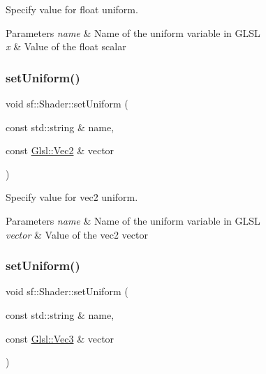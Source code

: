 Specify value for {\ttfamily float} uniform. 


\begin{DoxyParams}{Parameters}
{\em name} & Name of the uniform variable in G\+L\+SL \\
\hline
{\em x} & Value of the float scalar \\
\hline
\end{DoxyParams}
\mbox{\label{classsf_1_1_shader_a4a2c673c41e37b17d67e4af1298b679f}} 
\subsubsection{\texorpdfstring{set\+Uniform()}{setUniform()}\hspace{0.1cm}{\footnotesize\ttfamily [2/16]}}
{\footnotesize\ttfamily void sf\+::\+Shader\+::set\+Uniform (\begin{DoxyParamCaption}\item[{const std\+::string \&}]{name,  }\item[{const \hyperlink{namespacesf_1_1_glsl_adeed356d346d87634b4c197a530e4edf}{Glsl\+::\+Vec2} \&}]{vector }\end{DoxyParamCaption})}



Specify value for {\ttfamily vec2} uniform. 


\begin{DoxyParams}{Parameters}
{\em name} & Name of the uniform variable in G\+L\+SL \\
\hline
{\em vector} & Value of the vec2 vector \\
\hline
\end{DoxyParams}
\mbox{\label{classsf_1_1_shader_aad654ad8de6f0c56191fa7b8cea21db2}} 
\subsubsection{\texorpdfstring{set\+Uniform()}{setUniform()}\hspace{0.1cm}{\footnotesize\ttfamily [3/16]}}
{\footnotesize\ttfamily void sf\+::\+Shader\+::set\+Uniform (\begin{DoxyParamCaption}\item[{const std\+::string \&}]{name,  }\item[{const \hyperlink{namespacesf_1_1_glsl_a9bdd0463b7cb5316244a082007bd50f0}{Glsl\+::\+Vec3} \&}]{vector }\end{DoxyParamCaption})}



